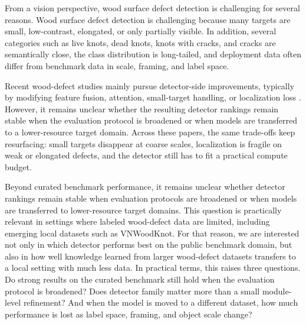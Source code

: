 \documentclass[cmc,article,submit,moreauthors,pdftex]{Definitions/tsp}
\begin{document}
From a vision perspective, wood surface defect detection is challenging for several reasons. Wood surface defect detection is challenging because many targets are small, low-contrast, elongated, or only partially visible. In addition, several categories such as live knots, dead knots, knots with cracks, and cracks are semantically close, the class distribution is long-tailed, and deployment data often differ from benchmark data in scale, framing, and label space.


Recent wood-defect studies mainly pursue detector-side improvements, typically by modifying feature fusion, attention, small-target handling, or localization loss \citep{odca_yolo,bpn_yolo,sim_yolo,fdd_yolo,an_cwb_yolov8}. However, it remains unclear whether the resulting detector rankings remain stable when the evaluation protocol is broadened or when models are transferred to a lower-resource target domain. Across these papers, the same trade-offs keep resurfacing: small targets disappear at coarse scales, localization is fragile on weak or elongated defects, and the detector still has to fit a practical compute budget.


Beyond curated benchmark performance, it remains unclear whether detector rankings remain stable when evaluation protocols are broadened or when models are transferred to lower-resource target domains. This question is practically relevant in settings where labeled wood-defect data are limited, including emerging local datasets such as VNWoodKnot. For that reason, we are interested not only in which detector performs best on the public benchmark domain, but also in how well knowledge learned from larger wood-defect datasets transfers to a local setting with much less data. In practical terms, this raises three questions. Do strong results on the curated benchmark still hold when the evaluation protocol is broadened? Does detector family matter more than a small module-level refinement? And when the model is moved to a different dataset, how much performance is lost as label space, framing, and object scale change?
\end{document}
